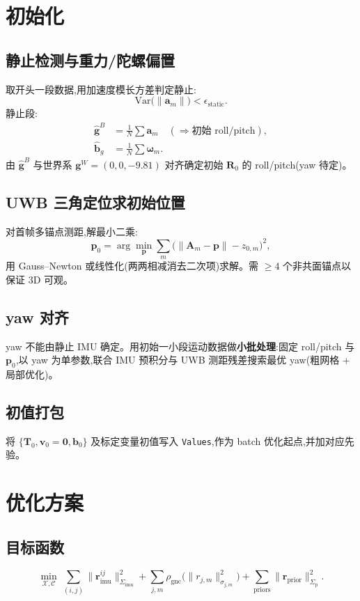 \documentclass[11pt,a4paper]{report}
\newcommand{\bp}{\bm{p}}
\newcommand{\bv}{\bm{v}}
\newcommand{\bb}{\bm{b}}
\newcommand{\bg}{\bm{g}}
\newcommand{\bR}{\bm{R}}
\newcommand{\bT}{\bm{T}}
\newcommand{\bA}{\bm{A}}
\newcommand{\ba}{\bm{a}}
\newcommand{\bw}{\bm{\omega}}
\begin{document}
\chapter{初始化}

\section{静止检测与重力/陀螺偏置}
取开头一段数据,用加速度模长方差判定静止:
\begin{equation}
\mathrm{Var}\big(\|\ba_m\|\big)<\epsilon_{\text{static}}.
\end{equation}
静止段:
\begin{align}
\hat{\bg}^B &= \frac{1}{N}\sum \ba_m \quad(\Rightarrow \text{初始 roll/pitch}),\\
\hat{\bb}_g &= \frac{1}{N}\sum \bw_m.
\end{align}
由 $\hat{\bg}^B$ 与世界系 $\bg^W=(0,0,-9.81)$ 对齐确定初始 $\bR_0$ 的 roll/pitch(yaw 待定)。

\section{UWB 三角定位求初始位置}
对首帧多锚点测距,解最小二乘:
\begin{equation}
\bp_0 = \arg\min_{\bp}\sum_m \big(\|\bA_m-\bp\|-z_{0,m}\big)^2,
\end{equation}
用 Gauss--Newton 或线性化(两两相减消去二次项)求解。需 $\geq 4$ 个非共面锚点以保证 3D 可观。

\section{yaw 对齐}
yaw 不能由静止 IMU 确定。用初始一小段运动数据做\textbf{小批处理}:固定 roll/pitch 与 $\bp_0$,以 yaw 为单参数,联合 IMU 预积分与 UWB 测距残差搜索最优 yaw(粗网格 + 局部优化)。

\section{初值打包}
将 $\{\bT_0,\bv_0\!=\!\bm{0},\bb_0\}$ 及标定变量初值写入 \texttt{Values},作为 batch 优化起点,并加对应先验。

\chapter{优化方案}

\section{目标函数}
\begin{equation}
\min_{\mathcal{X},\mathcal{C}}\ 
\sum_{(i,j)}\|\bm{r}_{\text{imu}}^{ij}\|^2_{\Sigma_{\text{imu}}}
+\sum_{j,m}\rho_{\text{gnc}}\!\Big(\|r_{j,m}\|^2_{\sigma_{j,m}}\Big)
+\sum_{\text{priors}}\|\bm{r}_{\text{prior}}\|^2_{\Sigma_{\text{p}}}.
\end{equation}
\end{document}
